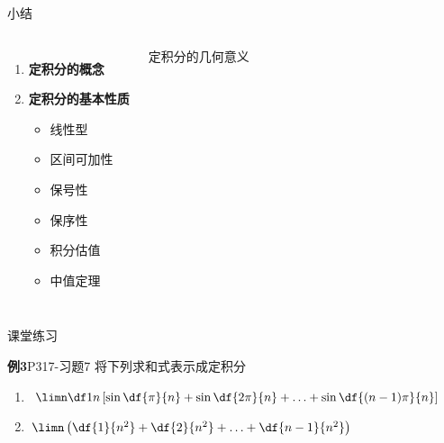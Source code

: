 \begin{frame}[<+->]{小结}
	\linespread{1.5}
	\begin{columns}
		\begin{enumerate}
		  \item {\bf 定积分的概念}
		  \item {\bf 定积分的基本性质}
		  \begin{itemize}
		    \item 线性型
		    \item 区间可加性
		    \item 保号性
		    \item 保序性
		    \item 积分估值
		    \item 中值定理
		  \end{itemize}
		\end{enumerate}
		\begin{center}
			\alert{定积分的几何意义}\\
		\end{center}
	\end{columns}
	
\end{frame}

\begin{frame}{课堂练习}
	\linespread{2}
	\begin{exampleblock}{{\bf 例3}\hfill P317-习题7}
		将下列求和式表示成定积分\pause 
		\begin{enumerate}
		  \item $\limn\df 1n\left[\sin\df{\pi}{n}+\sin\df{2\pi}{n}+\ldots
		  +\sin\df{(n-1)\pi}{n}\right]$\pause 
		  \item $\limn\left(\df{1}{n^2}+\df{2}{n^2}+\ldots+\df{n-1}{n^2}\right)$
		\end{enumerate}
	\end{exampleblock}
\end{frame}


